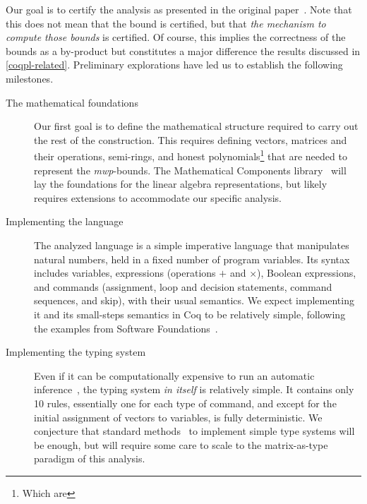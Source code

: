Our goal is to certify the analysis as presented in {the original paper}~\cite{jones2009}.
Note that this does not mean that the bound is certified, but that \emph{the mechanism to compute those bounds} is certified.
Of course, this implies the correctness of the bounds as a by-product but constitutes a major difference \wrt the results discussed in \autoref{coqpl-related}.
Preliminary explorations have led us to establish the following milestones.

\begin{description}
  \item[The mathematical foundations]
  Our first goal is to define the mathematical structure required to carry out the rest of the construction.
  This requires defining vectors, matrices and their operations, semi-rings, and honest polynomials\footnote{%
    Which are } that are needed to represent the \emph{mwp}-bounds.
  The Mathematical Components library~\cite{mahboubi2022,mathcomp} will lay the foundations for the linear algebra representations, but likely requires extensions to accommodate our specific analysis.

  \item[Implementing the language]
  The analyzed language is a simple imperative language that manipulates natural numbers, held in a fixed number of program variables.
  Its syntax includes variables, expressions (operations \(+\) and \(\times\)), Boolean expressions, and commands
  (\eg  assignment, loop and decision statements, command sequences, and skip), with their usual semantics.
  We expect implementing it and its small-steps semantics in Coq to be relatively simple, following the examples from Software Foundations~\cite{cpierce20221,cpierce20222}.

  \item[Implementing the typing system]
  Even if it can be computationally expensive to run an automatic inference~\cite{aubert2023b}, the typing system \emph{in itself} is relatively simple.
  It contains only 10 rules, essentially one for each type of command, and except for the initial assignment of vectors to variables, is fully deterministic.
  We conjecture that standard methods~\cite{chlipala2022, chlipala2010} to implement simple type systems will be enough, but will require some care to scale to the matrix-as-type paradigm of this analysis.


\end{description}

